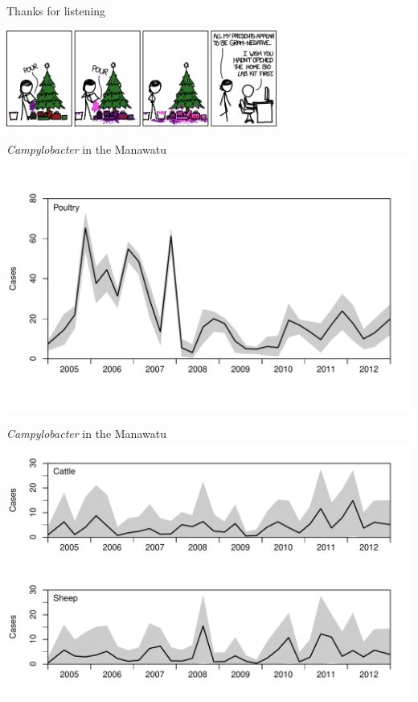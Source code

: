 \documentclass[]{beamer}
\begin{document}

\begin{frame}{Thanks for listening}
\begin{center}
\includegraphics[width=3.5in]{Pictures/questions}
\end{center}
\end{frame}

\begin{frame}{\emph{Campylobacter} in the Manawatu}
\includegraphics[width=\textwidth, trim=40 0 40 0]{Pictures/island/totals_Poultry.pdf}
\end{frame}

\begin{frame}{\emph{Campylobacter} in the Manawatu}
\includegraphics[width=\textwidth, trim=40 0 40 0]{Pictures/island/totals_ruminants_combined.pdf}
\end{frame}
\end{document}
